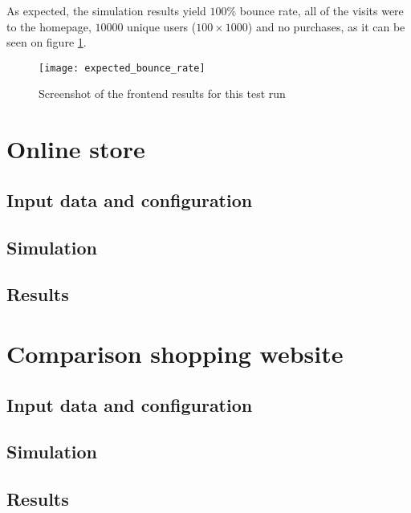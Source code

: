 As expected, the simulation results yield $100\%$ bounce rate, all of the 
visits were to the homepage, $10000$ unique users ($100 \times 1000$) and no 
purchases, as it can be seen on figure \ref{fig:test3result}.

\begin{figure}[h]
    \begin{center}
        \leavevmode
        \texttt{[image: expected\_bounce\_rate]}
        \caption{Screenshot of the frontend results for this test run}
        \label{fig:test3result}
    \end{center}
\end{figure}


\section{Online store}


\subsection{Input data and configuration}
\subsection{Simulation}
\subsection{Results}

\section{Comparison shopping website}


\subsection{Input data and configuration}
\subsection{Simulation}
\subsection{Results}
